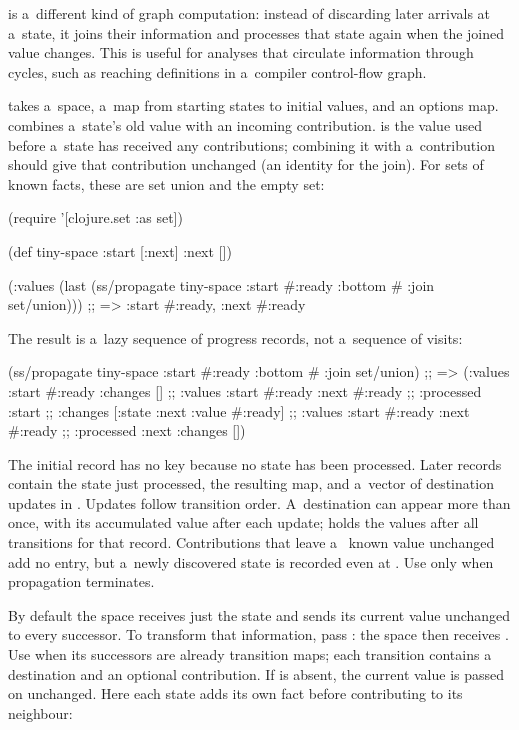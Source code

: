  is a~different kind of graph computation: instead of
discarding later arrivals at a~state, it joins their information and
processes that state again when the joined value changes. This is useful for
analyses that circulate information through cycles, such as reaching
definitions in a~compiler control-flow graph.

 takes a~space, a~map from starting states to initial
values, and an options map.  combines a~state's old value with
an incoming contribution.  is the value used before a~state
has received any contributions; combining it with a~contribution should
give that contribution unchanged (an identity for the join).
For sets of known facts, these are set union and the empty set:

\begtt {}
(require '[clojure.set :as set])

(def tiny-space {:start [:next]
                 :next []})

(:values (last (ss/propagate tiny-space
                                 {:start #{:ready}}
                                 {:bottom #{}
                                  :join set/union})))
;; => {:start #{:ready}, :next #{:ready}}
\endtt

The result is a~lazy sequence of progress records, not a~sequence of visits:

\begtt {}
(ss/propagate tiny-space {:start #{:ready}}
              {:bottom #{} :join set/union})
;; => ({:values {:start #{:ready}} :changes []}
;;     {:values {:start #{:ready} :next #{:ready}}
;;      :processed :start
;;      :changes [{:state :next :value #{:ready}}]}
;;     {:values {:start #{:ready} :next #{:ready}}
;;      :processed :next :changes []})
\endtt

The initial record has no  key because no state has been
processed. Later records contain the state just processed, the resulting
 map, and a~vector of destination updates in .
Updates follow transition order. A~destination can appear more than once,
with its accumulated value after each update;  holds the
values after all transitions for that record. Contributions that leave a~
known value unchanged add no entry, but a~newly discovered state is recorded
even at . Use  only when propagation terminates.

By default the space receives just the state and sends its current value
unchanged to every successor. To transform that information, pass
: the space then receives
. Use  when
its successors are already transition maps; each transition contains a~
destination  and an optional  contribution.
If  is absent, the current value is passed on unchanged.
Here each state adds its own fact before contributing to its neighbour:

